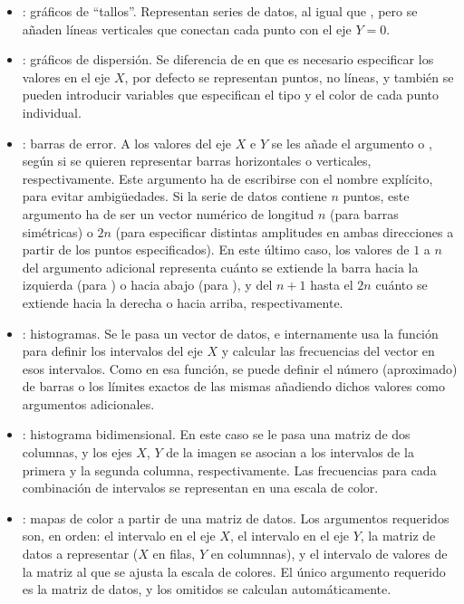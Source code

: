 ﻿\documentclass[spanish]{article}
\begin{document}
\begin{itemize}
  \item {}: gráficos de ``tallos''. Representan series de datos, al igual que , pero se añaden líneas verticales que conectan cada punto con el eje $Y=0$.
  \item {}: gráficos de dispersión. Se diferencia de  en que es necesario especificar los valores en el eje $X$, por defecto se representan puntos, no líneas, y también se pueden introducir variables que especifican el tipo y el color de cada punto individual.
  \item {}: barras de error. A los valores del eje $X$ e $Y$ se les añade el argumento  o , según si se quieren representar barras horizontales o verticales, respectivamente. Este argumento ha de escribirse con el nombre explícito, para evitar ambigüedades. Si la serie de datos contiene $n$ puntos, este argumento ha de ser un vector numérico de longitud $n$ (para barras simétricas) o $2n$ (para especificar distintas amplitudes en ambas direcciones a partir de los puntos especificados). En este último caso, los valores de $1$ a $n$ del argumento adicional representa cuánto se extiende la barra hacia la izquierda (para ) o hacia abajo (para ), y del $n+1$ hasta el $2n$ cuánto se extiende hacia la derecha o hacia arriba, respectivamente.
  \item {}: histogramas. Se le pasa un vector de datos, e internamente usa la función  para definir los intervalos del eje $X$ y calcular las frecuencias del vector en esos intervalos. Como en esa función, se puede definir el número (aproximado) de barras o los límites exactos de las mismas añadiendo dichos valores como argumentos adicionales.
  \item{}: histograma bidimensional. En este caso se le pasa una matriz de dos columnas, y los ejes $X$, $Y$ de la imagen se asocian a los intervalos de la primera y la segunda columna, respectivamente. Las frecuencias para cada combinación de intervalos se representan en una escala de color.
  \item{}: mapas de color a partir de una matriz de datos. Los argumentos requeridos son, en orden: el intervalo en el eje $X$, el intervalo en el eje $Y$, la matriz de datos a representar ($X$ en filas, $Y$ en columnnas), y el intervalo de valores de la matriz al que se ajusta la escala de colores. El único argumento requerido es la matriz de datos, y los omitidos se calculan automáticamente.
\end{itemize}
\end{document}
